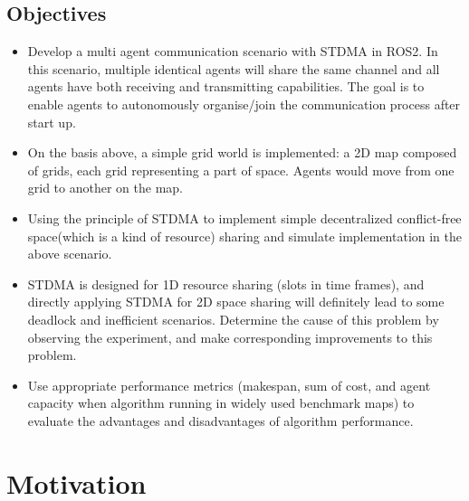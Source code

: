 \documentclass[12pt, oneside]{article}
\begin{document}
\subsection{Objectives}
\label{Objectives}
\begin{itemize}
    \item Develop a multi agent communication scenario with STDMA in ROS2. In this scenario, multiple identical agents will share the same channel and all agents have both receiving and transmitting capabilities. The goal is to enable agents to autonomously organise/join the communication process after start up.
    \item On the basis above, a simple grid world is implemented: a 2D map composed of grids, each grid representing a part of space. Agents would move from one grid to another on the map.
    \item Using the principle of STDMA \cite{STDMA} to implement simple decentralized conflict-free space(which is a kind of resource) sharing and simulate implementation in the above scenario.
    \item STDMA is designed for 1D resource sharing (slots in time frames), and directly applying STDMA for 2D space sharing will definitely lead to some deadlock and inefficient scenarios\cite{MAPF_Deadlock_Explain1,MAPF_Deadlock_Explain2}. Determine the cause of this problem by observing the experiment, and make corresponding improvements to this problem. 
    \item Use appropriate performance metrics (makespan, sum of cost, and agent capacity when algorithm running in widely used benchmark maps\cite{MAPF_Deadlock_Explain2}) to evaluate the advantages and disadvantages of algorithm performance. 
\end{itemize}


\section{Motivation}
\end{document}
